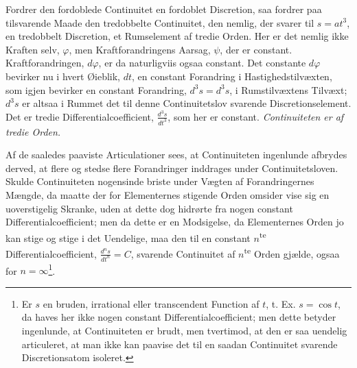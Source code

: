 \documentclass[12pt,a4paper]{book}
\begin{document}
Fordrer den fordoblede Continuitet en fordoblet Discretion,
saa fordrer paa tilsvarende Maade den tredobbelte
Continuitet, den nemlig, der svarer til $s = at^3$, en tredobbelt
Discretion, et Rumselement af tredie Orden. Her er
det nemlig ikke Kraften selv, $\varphi$, men Kraftforandringens
Aarsag, $\psi$, der er constant. Kraftforandringen, $d\varphi$, er da
naturligviis ogsaa constant. Det constante $d\varphi$ bevirker nu i
hvert Øieblik, $dt$, en constant Forandring i Hastighedstilvæxten,
som igjen bevirker en constant Forandring, $d^3s = d^3s$,
i Rumstilvæxtens Tilvæxt; $d^3s$ er altsaa i Rummet
det til denne Continuitetslov svarende Discretionselement.
Det er tredie Differentialcoefficient, $\frac{d^3s}{dt^3}$, som
her er constant. \emph{Continuiteten er af tredie Orden.}

Af de saaledes paaviste Articulationer sees, at Continuiteten
ingenlunde afbrydes derved, at flere og stedse flere Forandringer
inddrages under Continuitetsloven. Skulde Continuiteten
nogensinde briste under Vægten af Forandringernes
Mængde, da maatte der for Elementernes stigende Orden
omsider vise sig en uoverstigelig Skranke, uden at dette dog
hidrørte fra nogen constant Differentialcoefficient; men da
dette er en Modsigelse, da Elementernes Orden jo kan stige
og stige i det Uendelige, maa den til en constant
$n$\textsuperscript{te} Differentialcoefficient,
$\frac{d^ns}{dt^n} = C$, svarende Continuitet af
$n$\textsuperscript{te} Orden
gjælde, ogsaa for $n = \infty$\footnote{Er $s$ en bruden,
irrational eller transcendent Function af $t$,
t. Ex. $s = \cos t$, da haves her ikke nogen constant
Differentialcoefficient; men dette betyder ingenlunde, at
Continuiteten er brudt, men tvertimod, at den er saa uendelig
articuleret, at man ikke kan paavise det til en saadan
Continuitet svarende Discretionsatom isoleret.}.
\end{document}
